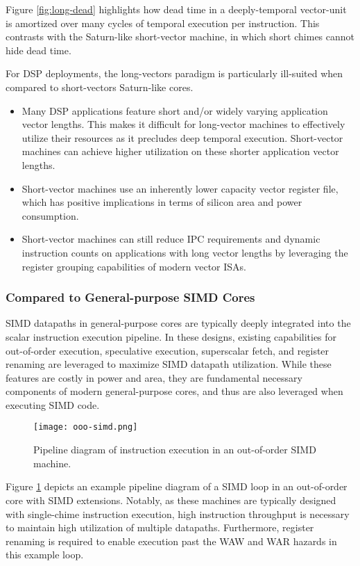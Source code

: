 Figure \ref{fig:long-dead} highlights how dead time in a deeply-temporal vector-unit is amortized over many cycles of temporal execution per instruction.
This contrasts with the Saturn-like short-vector machine, in which short chimes cannot hide dead time.

For DSP deployments, the long-vectors paradigm is particularly ill-suited when compared to short-vectors Saturn-like cores.

\begin{itemize}
\item Many DSP applications feature short and/or widely varying application vector lengths. This makes it difficult for long-vector machines to effectively utilize their resources as it precludes deep temporal execution. Short-vector machines can achieve higher utilization on these shorter application vector lengths.
\item Short-vector machines use an inherently lower capacity vector register file, which has positive implications in terms of silicon area and power consumption.
\item Short-vector machines can still reduce IPC requirements and dynamic instruction counts on applications with long vector lengths by leveraging the register grouping capabilities of modern vector ISAs.
\end{itemize}

\subsubsection{Compared to General-purpose SIMD Cores}

SIMD datapaths in general-purpose cores are typically deeply integrated into the scalar instruction execution pipeline.
In these designs, existing capabilities for out-of-order execution, speculative execution, superscalar fetch, and register renaming are leveraged to maximize SIMD datapath utilization.
While these features are costly in power and area, they are fundamental necessary components of modern general-purpose cores, and thus are also leveraged when executing SIMD code.

\begin{figure}[h]
  \centering
  \texttt{[image: ooo-simd.png]}
  \caption{Pipeline diagram of instruction execution in an out-of-order SIMD machine.}
  \label{fig:ooo}
\end{figure}

Figure \ref{fig:ooo} depicts an example pipeline diagram of a SIMD loop in an out-of-order core with SIMD extensions.
Notably, as these machines are typically designed with single-chime instruction execution, high instruction throughput is necessary to maintain high utilization of multiple datapaths.
Furthermore, register renaming is required to enable execution past the WAW and WAR hazards in this example loop.

